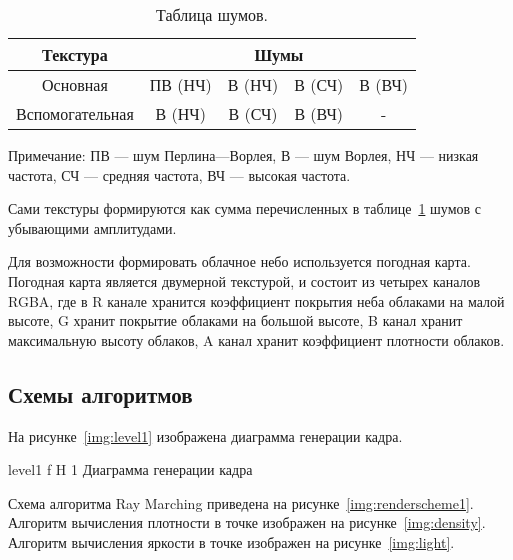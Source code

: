 \begin{table}[h]
	\centering
	\begin{threeparttable}
		\captionsetup{justification=raggedleft,singlelinecheck=false}
		\caption{Таблица шумов.}      
		\begin{tabular}{|c|c|c|c|c|}
			\hline
			Текстура & \multicolumn{4}{c|}{Шумы} \\
			\hline
			Основная & ПВ (НЧ) & В (НЧ) & В (СЧ) & В (ВЧ)\\
			\hline
			Вспомогательная & В (НЧ) & В (СЧ) & В (ВЧ) & -\\
			\hline
		\end{tabular}
		\begin{tablenotes}
			\small
			\item Примечание: ПВ --- шум Перлина---Ворлея, В --- шум Ворлея, НЧ --- низкая частота, СЧ --- средняя частота, ВЧ --- высокая частота.
		\end{tablenotes}
		\label{tab:textures}
	\end{threeparttable} 
	
	
\end{table}

Сами текстуры формируются как сумма перечисленных в таблице~\ref{tab:textures} шумов с убывающими амплитудами.

Для возможности формировать облачное небо используется погодная карта. Погодная карта является двумерной текстурой, и состоит из четырех каналов RGBA, где в R канале хранится коэффициент покрытия неба облаками на малой высоте, G хранит покрытие облаками на большой высоте, B канал хранит максимальную высоту облаков, A канал хранит коэффициент плотности облаков. 

\subsection{Схемы алгоритмов}

На рисунке~\ref{img:level1} изображена диаграмма генерации кадра.

{level1} %
{f} %
{H} %
{1\textwidth} %
{Диаграмма генерации кадра} %

Схема алгоритма Ray Marching приведена на рисунке~\ref{img:renderscheme1}. Алгоритм вычисления плотности в точке изображен на рисунке~\ref{img:density}. Алгоритм вычисления яркости в точке изображен на рисунке~\ref{img:light}.


